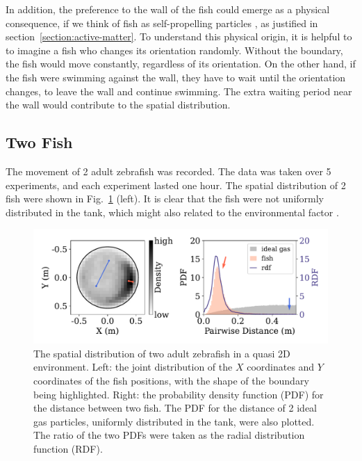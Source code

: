 \documentclass[11pt,twoside]{report}
\begin{document}
In addition, the preference to the wall of the fish could emerge as a physical consequence, if we think of fish as self-propelling particles \cite{lee2013, maggi2015, bechinger2016}, as justified in section~\ref{section:active-matter}. To understand this physical origin, it is helpful to to imagine a fish who changes its orientation randomly. Without the boundary, the fish would move constantly, regardless of its orientation. On the other hand, if the fish were swimming against the wall, they have to wait until the orientation changes, to leave the wall and continue swimming. The extra waiting period near the wall would contribute to the spatial distribution.



\subsection{Two Fish}
\label{section:fish_2_2d}

The movement of 2 adult zebrafish was recorded. The data was taken over 5 experiments, and each experiment lasted one hour.
The spatial distribution of 2 fish were shown in Fig.~\ref{fig:density_2d_fish_2} (left). It is clear that the fish were not uniformly distributed in the tank, which might also related to the environmental factor \cite{makris2006, rosemberg2011, shelton2020}.

\begin{figure}
  \includegraphics[width=\linewidth]{dist-2-fish}
  \caption[The 2D spatial distribution of two fish]{The spatial distribution of two adult zebrafish in a quasi 2D environment. Left: the joint distribution of the $X$ coordinates and $Y$ coordinates of the fish positions, with the shape of the boundary being highlighted. Right: the probability density function (PDF) for the distance between two fish. The PDF for the distance of 2 ideal gas particles, uniformly distributed in the tank, were also plotted. The ratio of the two \gls{PDF}s were taken as the radial distribution function (RDF).}
  \label{fig:density_2d_fish_2}
\end{figure}
\end{document}
